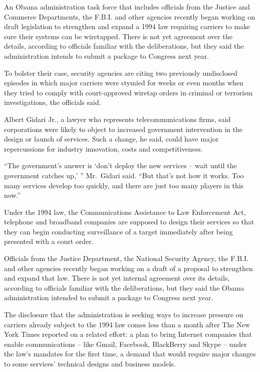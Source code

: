 ﻿\documentclass[12pt]{article}
\begin{document}
An Obama administration task force that includes officials from the Justice and Commerce
Departments, the F.B.I. and other agencies recently began working on draft legislation to strengthen
and expand a 1994 law requiring carriers to make sure their systems can be wiretapped. There is not
yet agreement over the details, according to officials familiar with the deliberations, but they
said the administration intends to submit a package to Congress next year.

To bolster their case, security agencies are citing two previously undisclosed episodes in which
major carriers were stymied for weeks or even months when they tried to comply with court-approved
wiretap orders in criminal or terrorism investigations, the officials said.

Albert Gidari Jr., a lawyer who represents telecommunications firms, said corporations were likely
to object to increased government intervention in the design or launch of services. Such a change,
he said, could have major repercussions for industry innovation, costs and competitiveness.

``The government's answer is `don't deploy the new services -- wait until the government catches
up,' '' Mr.~Gidari said. ``But that's not how it works. Too many services develop too quickly, and
there are just too many players in this now.''

Under the 1994 law, the Communications Assistance to Law Enforcement Act, telephone and broadband
companies are supposed to design their services so that they can begin conducting surveillance of a
target immediately after being presented with a court order.

Officials from the Justice Department, the National Security Agency, the F.B.I. and other agencies
recently began working on a draft of a proposal to strengthen and expand that law. There is not yet
internal agreement over its details, according to officials familiar with the deliberations, but
they said the Obama administration intended to submit a package to Congress next year.

The disclosure that the administration is seeking ways to increase pressure on carriers already
subject to the 1994 law comes less than a month after The New York Times reported on a related
effort: a plan to bring Internet companies that enable communications -- like Gmail, Facebook,
BlackBerry and Skype -- under the law's mandates for the first time, a demand that would require
major changes to some services' technical designs and business models.
\end{document}
